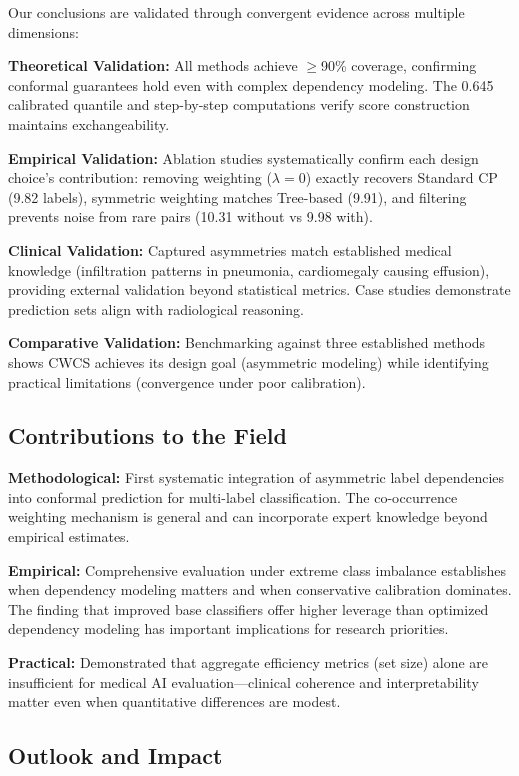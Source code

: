 Our conclusions are validated through convergent evidence across multiple dimensions:

\textbf{Theoretical Validation:} All methods achieve $\geq$90\% coverage, confirming conformal guarantees hold even with complex dependency modeling. The 0.645 calibrated quantile and step-by-step computations verify score construction maintains exchangeability.

\textbf{Empirical Validation:} Ablation studies systematically confirm each design choice's contribution: removing weighting ($\lambda=0$) exactly recovers Standard CP (9.82 labels), symmetric weighting matches Tree-based (9.91), and filtering prevents noise from rare pairs (10.31 without vs 9.98 with).

\textbf{Clinical Validation:} Captured asymmetries match established medical knowledge (infiltration patterns in pneumonia, cardiomegaly causing effusion), providing external validation beyond statistical metrics. Case studies demonstrate prediction sets align with radiological reasoning.

\textbf{Comparative Validation:} Benchmarking against three established methods shows CWCS achieves its design goal (asymmetric modeling) while identifying practical limitations (convergence under poor calibration).

\subsection{Contributions to the Field}

\textbf{Methodological:} First systematic integration of asymmetric label dependencies into conformal prediction for multi-label classification. The co-occurrence weighting mechanism is general and can incorporate expert knowledge beyond empirical estimates.

\textbf{Empirical:} Comprehensive evaluation under extreme class imbalance establishes when dependency modeling matters and when conservative calibration dominates. The finding that improved base classifiers offer higher leverage than optimized dependency modeling has important implications for research priorities.

\textbf{Practical:} Demonstrated that aggregate efficiency metrics (set size) alone are insufficient for medical AI evaluation---clinical coherence and interpretability matter even when quantitative differences are modest.

\subsection{Outlook and Impact}

